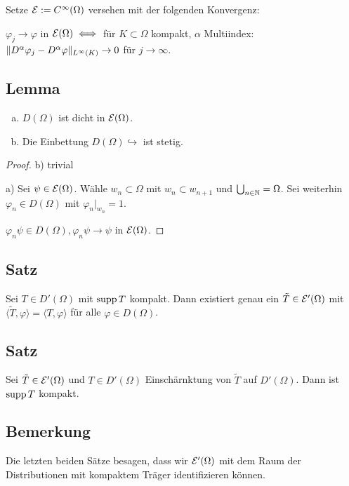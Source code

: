 Setze $\mathcal{E} := C^\infty(\Omega)$ versehen mit der folgenden Konvergenz:

$\varphi_j \to \varphi $ in $ \mathcal{E}(\Omega) \iff $ für $K \subset \Omega$ kompakt, $\alpha$ Multiindex: $\lVert D^\alpha \varphi_j - D^\alpha \varphi \rVert_{L^\infty(K)} \to 0$ für $j \to \infty$.

\subsection{Lemma}

\begin{enumerate}[a)]
  \item $D(\Omega)$ ist dicht in $\mathcal{E}(\Omega)$.
  \item Die Einbettung $D(\Omega) \hookrightarrow$ ist stetig.
\end{enumerate}

\begin{proof}
  b) trivial

  a) Sei $\psi \in \mathcal{E}(\Omega)$. 
  Wähle $w_n \subset \Omega$ mit $w_n \subset w_{n+1}$ und $\bigcup_{n \in \mathbb{N}} = \Omega$.
  Sei weiterhin $\varphi_n \in D(\Omega)$ mit $\varphi_n|_{w_n} = 1$.

  $\varphi_n \psi \in D(\Omega), \varphi_n \psi \to \psi$ in $\mathcal{E}(\Omega)$.
\end{proof}

\subsection{Satz}

Sei $T \in D'(\Omega)$ mit $\operatorname{supp} T$ kompakt.
Dann existiert genau ein $\tilde T \in \mathcal{E}'(\Omega)$ mit $\langle \tilde T, \varphi \rangle = \langle T , \varphi \rangle$ für alle $\varphi \in D(\Omega)$.

\subsection{Satz}

Sei $\tilde T \in \mathcal{E}'(\Omega)$ und $T \in D'(\Omega)$ Einschärnktung von $\tilde T$ auf $D'(\Omega)$.
Dann ist $\operatorname{supp} T$ kompakt.

\subsection{Bemerkung}
Die letzten beiden Sätze besagen, dass wir $\mathcal{E}'(\Omega)$ mit dem Raum der Distributionen mit kompaktem Träger identifizieren können.
